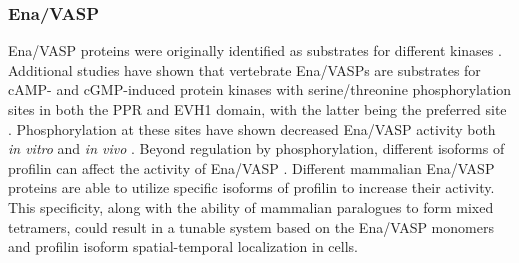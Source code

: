 \subsubsection{Ena/VASP}
Ena/VASP proteins were originally identified as substrates for different kinases \citep{halbrugge_analysis_1990,gertler_genetic_1990}. Additional studies have shown that vertebrate Ena/VASPs are substrates for cAMP- and cGMP-induced protein kinases with serine/threonine phosphorylation sites in both the PPR and EVH1 domain, with the latter being the preferred site \citep{gertler_mena_1996,lambrechts_camp-dependent_2000,harbeck_phosphorylation_2000,butt_camp-_1994}. Phosphorylation at these sites have shown decreased Ena/VASP activity both \textit{in vitro} and \textit{in vivo} \citep{loureiro_critical_2002,howe_regulation_2002,benz_differential_2009,butt_camp-_1994}. 
Beyond regulation by phosphorylation, different isoforms of profilin can affect the activity of Ena/VASP \citep{hansen_vasp_2010,mouneimne_differential_2012}. Different mammalian Ena/VASP proteins are able to utilize specific isoforms of profilin to increase their activity. This specificity, along with the ability of mammalian paralogues to form mixed tetramers, could result in a tunable system based on the Ena/VASP monomers and profilin isoform spatial-temporal localization in cells. 

